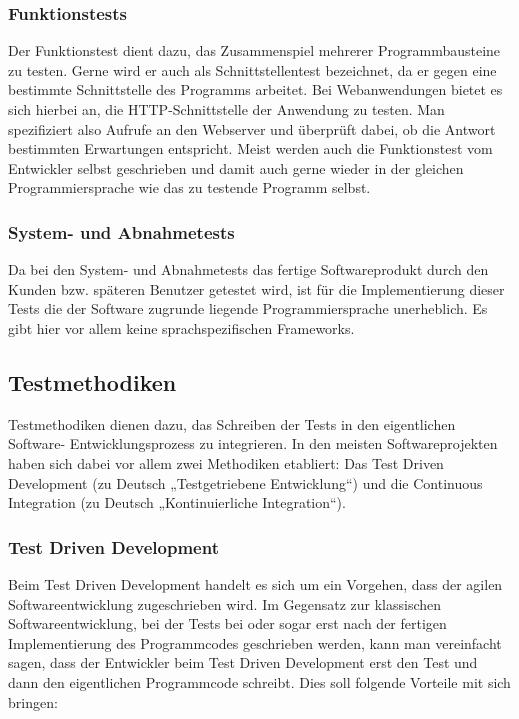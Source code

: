 \subsubsection{Funktionstests}
Der Funktionstest dient dazu, das Zusammenspiel mehrerer Programmbausteine zu testen. Gerne wird er auch als Schnittstellentest bezeichnet, da er gegen eine bestimmte Schnittstelle des Programms arbeitet. Bei Webanwendungen bietet es sich hierbei an, die HTTP-Schnittstelle der Anwendung zu testen. Man spezifiziert also Aufrufe an den Webserver und überprüft dabei, ob die Antwort bestimmten Erwartungen entspricht. Meist werden auch die Funktionstest vom Entwickler selbst geschrieben und damit auch gerne wieder in der gleichen Programmiersprache wie das zu testende Programm selbst.

\subsubsection{System- und Abnahmetests}
Da bei den System- und Abnahmetests das fertige Softwareprodukt durch den Kunden bzw. späteren Benutzer getestet wird, ist für die Implementierung dieser Tests die der Software zugrunde liegende Programmiersprache unerheblich. Es gibt hier vor allem keine sprachspezifischen Frameworks.

\subsection{Testmethodiken}
Testmethodiken dienen dazu, das Schreiben der Tests in den eigentlichen Software- Entwicklungsprozess zu integrieren. In den meisten Softwareprojekten haben sich dabei vor allem zwei Methodiken etabliert: Das Test Driven Development (zu Deutsch „Testgetriebene Entwicklung“) und die Continuous Integration (zu Deutsch „Kontinuierliche Integration“).

\subsubsection{Test Driven Development}
Beim Test Driven Development handelt es sich um ein Vorgehen, dass der agilen Softwareentwicklung zugeschrieben wird. Im Gegensatz zur klassischen Softwareentwicklung, bei der Tests bei oder sogar erst nach der fertigen Implementierung des Programmcodes geschrieben werden, kann man vereinfacht sagen, dass der Entwickler beim Test Driven Development erst den Test und dann den eigentlichen Programmcode schreibt. Dies soll folgende Vorteile mit sich bringen:

